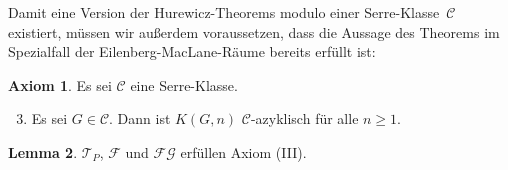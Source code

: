 \documentclass[11pt, a4paper, german]{article}
\theoremstyle{definition}
\newtheorem{lem}{Lemma}
\newtheorem{axiom}[lem]{Axiom}
\theoremstyle{remark}
\newcommand{\SC}{\mathcal{C}} %
\newcommand{\FG}{\mathcal{FG}} %
\newcommand{\T}{\mathcal{T}} %
\newcommand{\F}{\mathcal{F}} %
\begin{document}
Damit eine Version der Hurewicz-Theorems modulo einer Serre-Klasse~$\SC$ existiert, müssen wir außerdem voraussetzen, dass die Aussage des Theorems im Spezialfall der Eilenberg-MacLane-Räume bereits erfüllt ist:

\begin{axiom}
  Es sei $\SC$ eine Serre-Klasse.
  \begin{enumerate}[label=(\Roman*)]
    \setcounter{enumi}{2}
    \item Es sei $G \in \SC$.
    Dann ist $K(G, n)$ $\SC$-azyklisch für alle $n \geq 1$.
  \end{enumerate}
\end{axiom}

\begin{lem}\label{homology-kgn-in-c}
  $\T_P$, $\F$ und $\FG$ erfüllen Axiom (III).
\end{lem}
\end{document}
